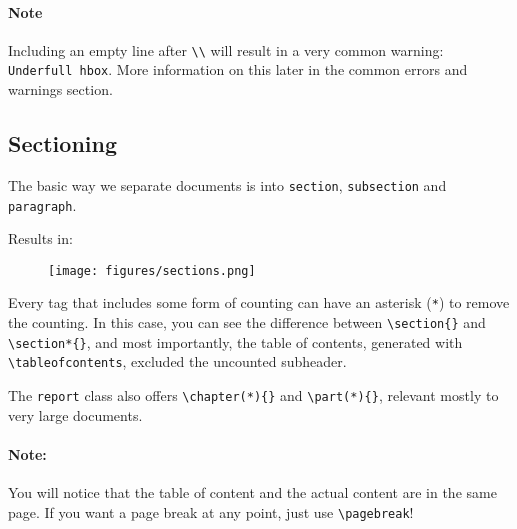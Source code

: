 \paragraph{Note} Including an empty line after \verb|\\| will result in a very common warning: \verb|Underfull hbox|. More information on this later in the common errors and warnings section.

\subsection{Sectioning}
The basic way we separate documents is into \verb|section|, \verb|subsection| and \verb|paragraph|.



Results in: 
\begin{figure}[h]
    \centering
    \texttt{[image: figures/sections.png]}
    \label{fig:sections}
\end{figure}

Every tag that includes some form of counting can have an asterisk (\verb|*|) to remove the counting.
In this case, you can see the difference between \verb|\section{}| and \verb|\section*{}|, and most importantly, the table of contents, generated with \verb|\tableofcontents|, excluded the uncounted subheader.

The \verb|report| class also offers \verb|\chapter(*){}| and \verb|\part(*){}|, relevant mostly to very large documents.

\paragraph{Note:} You will notice that the table of content and the actual content are in the same page. If you want a page break at any point, just use \verb|\pagebreak|!

